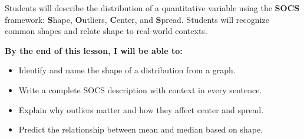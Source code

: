 \documentclass[aspectratio=169, 11pt]{beamer}
\begin{document}
{
\begin{frame}[t, plain]
  \vspace{0.45cm}\par
  \hspace{0.55cm}%
  \begin{minipage}{0.9\textwidth}


    \normalsize
    Students will describe the distribution of a quantitative variable
    using the \textbf{SOCS} framework: \textbf{S}hape, \textbf{O}utliers,
    \textbf{C}enter, and \textbf{S}pread. Students will recognize common
    shapes and relate shape to real-world contexts.

    \vspace{0.45cm}

    \normalsize\textbf{\color{navy}By the end of this lesson, I will be able to:}

    \smallskip
    \begin{itemize}
      \setlength{\itemsep}{0.3em}\setlength{\topsep}{0.2em}
      \item Identify and name the shape of a distribution from a graph.
      \item Write a complete SOCS description with context in every sentence.
      \item Explain why outliers matter and how they affect center and spread.
      \item Predict the relationship between mean and median based on shape.
    \end{itemize}

  \end{minipage}
\end{frame}
}
\end{document}
